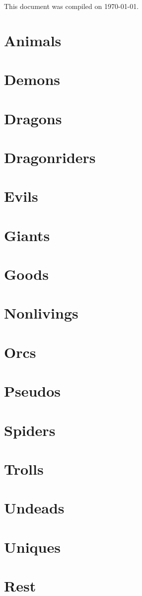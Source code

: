 \documentclass[12pt,english]{article}
\begin{document}

\begin{center}
    This document was compiled on \today.
\end{center}

\tableofcontents
\newpage
{}
\section{Animals}

\section{Demons}

\section{Dragons}

\section{Dragonriders}

\section{Evils}

\section{Giants}

\section{Goods}

\section{Nonlivings}

\section{Orcs}

\section{Pseudos}

\section{Spiders}

\section{Trolls}

\section{Undeads}

\section{Uniques}

\section{Rest}

\end{document}
